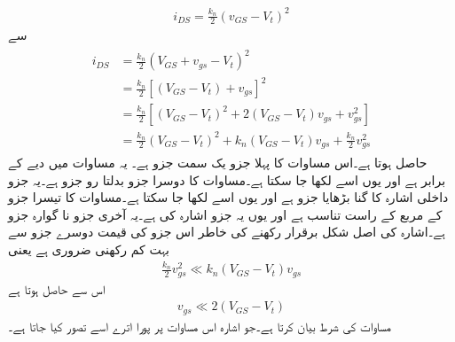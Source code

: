 \begin{align}\label{شناخت_مساوات_ماسفیٹ_خط_کی_مساوات_بدلتی_رو}
i_{DS}=\frac{k_n}{2} \left(v_{GS}-V_t \right)^2
\end{align}
سے
\begin{gather} \label{مساوات_میدانی_رو_کے_حصے}
\begin{aligned}
i_{DS}&=\frac{k_n}{2} \left(V_{GS}+v_{gs}-V_t \right )^2\\
&=\frac{k_n}{2}\left[\left(V_{GS}-V_t\right)+v_{gs} \right ]^2\\
&=\frac{k_n}{2} \left[\left(V_{GS}-V_t \right )^2+2 \left(V_{GS}-V_t \right ) v_{gs}+v_{gs}^{2} \right ] \\
&=\frac{k_n}{2} \left(V_{GS}-V_t \right )^2+k_n \left(V_{GS}-V_t \right ) v_{gs}+ \frac{k_n}{2} v_{gs}^{2} 
\end{aligned}
\end{gather}
حاصل ہوتا ہے۔اس مساوات کا پہلا جزو    یک سمت جزو ہے۔ یہ مساوات   میں دیے   کے برابر ہے اور یوں اسے  لکھا جا سکتا ہے۔مساوات کا دوسرا جزو   بدلتا رو جزو ہے۔یہ جزو داخلی اشارہ کا   گنا بڑھایا جزو ہے اور یوں اسے   لکھا جا سکتا ہے۔مساوات کا تیسرا جزو  کے مربع کے راست تناسب ہے اور یوں یہ جزو اشارہ کی   ہے۔یہ آخری جزو   نا گوارہ جزو ہے۔اشارہ کی اصل شکل برقرار رکھنے کی خاطر اس جزو کی قیمت دوسرے جزو سے بہت کم رکھنی ضروری ہے یعنی
\begin{align*}
\frac{k_n}{2}v_{gs}^2 \ll k_n \left(V_{GS}-V_t \right )v_{gs}
\end{align*}
اس سے حاصل ہوتا ہے
\begin{align} \label{مساوات_میدانی_باریک_اشارہ_کی_شرط}
v_{gs} \ll 2 \left(V_{GS}-V_t \right )
\end{align}
مساوات      کی شرط بیان کرتا ہے۔جو اشارہ اس مساوات پر پورا اترے اسے  تصور کیا جاتا ہے۔

